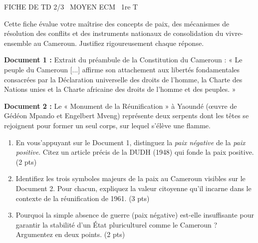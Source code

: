 \documentclass[11pt]{article}
\begin{document}
\begin{tcolorbox}[enhanced,colback=popink,colframe=popink,arc=10pt,boxrule=0pt,left=12pt,right=12pt,top=9pt,bottom=9pt]
{\color{white}\popxbold\small FICHE DE TD 2/3 \textbullet\ MOYEN \hfill ECM \textbullet\ 1re T\par}
\end{tcolorbox}
\vspace{4pt}
\noindent Cette fiche évalue votre maîtrise des concepts de paix, des mécanismes de résolution des conflits et des instruments nationaux de consolidation du vivre-ensemble au Cameroun. Justifiez rigoureusement chaque réponse.

\begin{exercice}
\textbf{Document 1 :} Extrait du préambule de la Constitution du Cameroun : « Le peuple du Cameroun [...] affirme son attachement aux libertés fondamentales consacrées par la Déclaration universelle des droits de l'homme, la Charte des Nations unies et la Charte africaine des droits de l'homme et des peuples. »

\textbf{Document 2 :} Le « Monument de la Réunification » à Yaoundé (œuvre de Gédéon Mpando et Engelbert Mveng) représente deux serpents dont les têtes se rejoignent pour former un seul corps, sur lequel s'élève une flamme.

\begin{enumerate}
    \item En vous'appuyant sur le Document 1, distinguez la \textit{paix négative} de la \textit{paix positive}. Citez un article précis de la DUDH (1948) qui fonde la paix positive. (2 pts)
    \item Identifiez les trois symboles majeurs de la paix au Cameroun visibles sur le Document 2. Pour chacun, expliquez la valeur citoyenne qu'il incarne dans le contexte de la réunification de 1961. (3 pts)
    \item Pourquoi la simple absence de guerre (paix négative) est-elle insuffisante pour garantir la stabilité d'un État pluriculturel comme le Cameroun ? Argumentez en deux points. (2 pts)
\end{enumerate}
\end{exercice}
\end{document}

